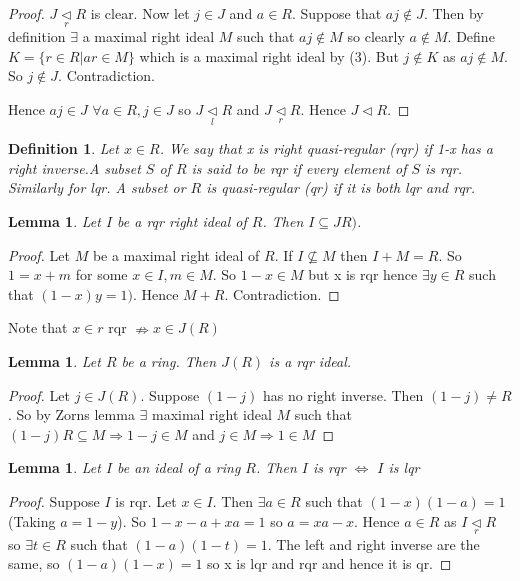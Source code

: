 \documentclass[a4paper,10pt]{article}
\newtheorem{defn}[thm]{Definition}
\newtheorem{lem}[thm]{Lemma}
\begin{document}
\begin{proof}
$J\underset{r}{\vartriangleleft} R$ is clear. Now let $j\in J$ and $a\in R$. Suppose that $aj\notin J$. Then by definition $\exists$ a maximal right ideal $M$ such that $aj\notin M$ so clearly $a\notin M$. \newline Define $K=\{ r\in R|ar\in M\}$ which is a maximal right ideal by (3). But $j\notin K$ as $aj\notin M$. So $j\notin J$. Contradiction.

Hence $aj\in J$ $\forall a\in R, j\in J$ so $J\underset{l}{\vartriangleleft} R$ and $J\underset{r}{\vartriangleleft} R$. Hence $J\vartriangleleft R$.
\end{proof}

\begin{defn}
Let $x\in R$. We say that x is right quasi-regular (rqr) if 1-x has a right inverse.\newline A subset $S$ of $R$ is said to be rqr if every element of $S$ is rqr. Similarly for lqr. A subset or $R$ is quasi-regular (qr) if it is both lqr and rqr.
\end{defn}

\begin{lem}
 Let $I$ be a rqr right ideal of $R$. Then $I\subseteq JR)$.
\end{lem}
\begin{proof}
Let $M$ be a maximal right ideal of $R$. If $I\nsubseteq M$ then $I+M=R$. So $1=x+m$ for some $x\in I, m\in M$. So $1-x\in M$ but x is rqr hence $\exists y\in R$ such that $(1-x)y=1)$. Hence $M+R$. Contradiction.
\end{proof}

Note that $x\in r$ rqr $\nRightarrow x\in J(R)$

\begin{lem}
 Let $R$ be a ring. Then $J(R)$ is a rqr ideal.
\end{lem}
\begin{proof}
Let $j\in J(R)$. Suppose $(1-j)$ has no right inverse. Then $(1-j)\neq R$. So by Zorns lemma $\exists$ maximal right ideal $M$ such that $(1-j)R\subseteq M\Rightarrow 1-j\in M$ and $j\in M\Rightarrow 1\in M$
\end{proof}

\begin{lem}
Let $I$ be an ideal of a ring $R$. Then $I$ is rqr $\Leftrightarrow$ $I$ is lqr
\end{lem}
\begin{proof}
Suppose $I$ is rqr. Let $x\in I$. Then $\exists a\in R$ such that $(1-x)(1-a)=1$ (Taking $a=1-y$). So $1-x-a+xa=1$ so $a=xa-x$. Hence $a\in R$ as $I\underset{r}{\vartriangleleft} R$ so $\exists t\in R$ such that $(1-a)(1-t)=1$. The left and right inverse are the same, so $(1-a)(1-x)=1$ so x is lqr and rqr and hence it is qr.
\end{proof}
\end{document}
